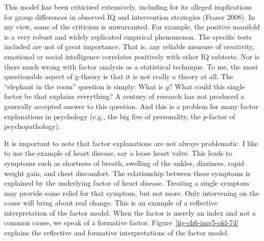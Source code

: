 \documentclass[
  a4paper,
  DIV=11,
  numbers=noendperiod]{scrreprt}
\begin{document}
This model has been criticized extensively, including for its alleged
implications for group differences in observed IQ and intervention
strategies (Fraser 2008). In my view, some of the criticism is
unwarranted. For example, the positive manifold is a very robust and
widely replicated empirical phenomenon. The specific tests included are
not of great importance. That is, any reliable measure of creativity,
emotional or social intelligence correlates positively with other IQ
subtests. Nor is there much wrong with factor analysis as a statistical
technique. To me, the most questionable aspect of g-theory is that it is
not really a theory at all. The ``elephant in the room'' question is
simply: What is \(g\)? What could this single factor be that explains
everything? A century of research has not produced a generally accepted
answer to this question. And this is a problem for many factor
explanations in psychology (e.g., the big five of personality, the
\(p\)-factor of psychopathology).

It is important to note that factor explanations are not always
problematic. I like to use the example of heart disease, say a loose
heart valve. This leads to symptoms such as shortness of breath,
swelling of the ankles, dizziness, rapid weight gain, and chest
discomfort. The relationship between these symptoms is explained by the
underlying factor of heart disease. Treating a single symptom may
provide some relief for that symptom, but not more. Only intervening on
the cause will bring about real change. This is an example of a
reflective interpretation of the factor model. When the factor is merely
an index and not a common cause, we speak of a formative factor.
Figure~\ref{fig-ch6-img5-old-74} explains the reflective and formative
interpretations of the factor model.
\end{document}
